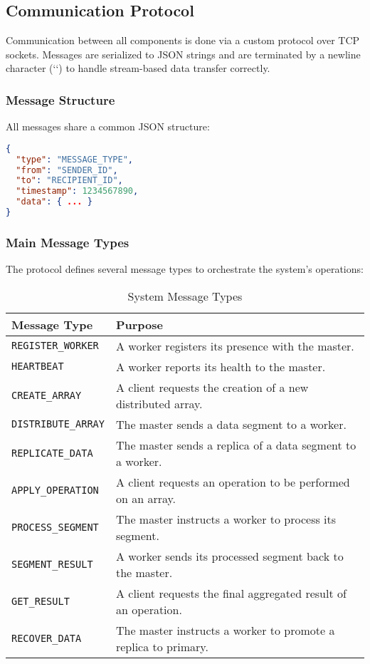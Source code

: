 \documentclass[10pt,a4paper]{article}
\theoremstyle{definition}
\theoremstyle{remark}
\begin{document}
\subsection{Communication Protocol}
Communication between all components is done via a custom protocol over TCP sockets. Messages are serialized to JSON strings and are terminated by a newline character (`\n`) to handle stream-based data transfer correctly.

\subsubsection{Message Structure}
All messages share a common JSON structure:
\begin{lstlisting}[language=json, caption={Generic Message Format}]
{
  "type": "MESSAGE_TYPE",
  "from": "SENDER_ID",
  "to": "RECIPIENT_ID", 
  "timestamp": 1234567890,
  "data": { ... }
}
\end{lstlisting}

\subsubsection{Main Message Types}
The protocol defines several message types to orchestrate the system's operations:

\begin{table}[H]
\centering
\caption{System Message Types}
\begin{tabular}{|l|l|}
\hline
\textbf{Message Type} & \textbf{Purpose} \\ \hline
\texttt{REGISTER\_WORKER} & A worker registers its presence with the master. \\ \hline
\texttt{HEARTBEAT} & A worker reports its health to the master. \\ \hline
\texttt{CREATE\_ARRAY} & A client requests the creation of a new distributed array. \\ \hline
\texttt{DISTRIBUTE\_ARRAY} & The master sends a data segment to a worker. \\ \hline
\texttt{REPLICATE\_DATA} & The master sends a replica of a data segment to a worker. \\ \hline
\texttt{APPLY\_OPERATION} & A client requests an operation to be performed on an array. \\ \hline
\texttt{PROCESS\_SEGMENT} & The master instructs a worker to process its segment. \\ \hline
\texttt{SEGMENT\_RESULT} & A worker sends its processed segment back to the master. \\ \hline
\texttt{GET\_RESULT} & A client requests the final aggregated result of an operation. \\ \hline
\texttt{RECOVER\_DATA} & The master instructs a worker to promote a replica to primary. \\ \hline
\end{tabular}
\end{table}
\end{document}
